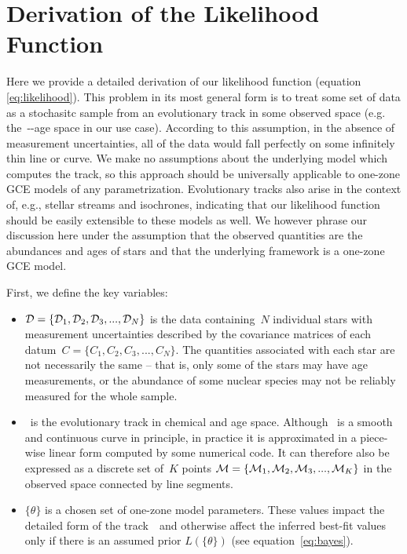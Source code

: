 \documentclass[ms.tex]{subfiles}
\begin{document}
\renewcommand\theequation{\thesection\arabic{equation}}
\renewcommand\thefigure{\thesection\arabic{figure}}
\setcounter{equation}{0}
\setcounter{figure}{0}

\section{Derivation of the Likelihood Function}
\label{sec:likelihood}

Here we provide a detailed derivation of our likelihood function (equation
\ref{eq:likelihood}).
This problem in its most general form is to treat some set of data as a
stochasitc sample from an evolutionary track in some observed space (e.g.
the~\afe-\feh-age space in our use case).
According to this assumption, in the absence of measurement uncertainties, all
of the data would fall perfectly on some infinitely thin line or curve.
We make no assumptions about the underlying model which computes the track, so
this approach should be universally applicable to one-zone GCE models of any
parametrization.
Evolutionary tracks also arise in the context of, e.g., stellar streams and
isochrones, indicating that our likelihood function should be easily extensible
to these models as well.
We however phrase our discussion here under the assumption that the observed
quantities are the abundances and ages of stars and that the underlying
framework is a one-zone GCE model.
\par
First, we define the key variables:
\begin{itemize}

	\item $\mathcal{D} = \{\mathcal{D}_1, \mathcal{D}_2, \mathcal{D}_3, ...,
	\mathcal{D}_N\}$ is the data containing~$N$ individual stars with
	measurement uncertainties described by the covariance matrices of each
	datum~$C = \{C_1, C_2, C_3, ..., C_N\}$.
	The quantities associated with each star are not necessarily the same --
	that is, only some of the stars may have age measurements, or the abundance
	of some nuclear species may not be reliably measured for the whole sample.

	\item {}~is the evolutionary track in chemical and age space.
	Although~ is a smooth and continuous curve in principle, in
	practice it is approximated in a piece-wise linear form computed by some
	numerical code.
	It can therefore also be expressed as a discrete set of~$K$ points
	$\mathcal{M} = \{\mathcal{M}_1, \mathcal{M}_2, \mathcal{M}_3, ...,
	\mathcal{M}_K\}$ in the observed space connected by line segments.

	\item $\{\theta\}$ is a chosen set of one-zone model parameters.
	These values impact the detailed form of the track~~and otherwise
	affect the inferred best-fit values only if there is an assumed prior
	$L(\{\theta\})$ (see equation~\ref{eq:bayes}).

\end{itemize}
\end{document}
